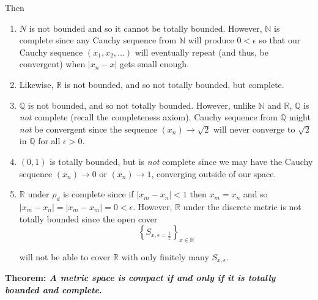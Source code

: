 \documentclass[12pt]{article}
\newcommand{\R}{\mathbb R}
\newcommand{\N}{\mathbb N}
\newcommand{\Q}{\mathbb Q}
\begin{document}
Then
\begin{enumerate}
	\item $N$ is not bounded and so it cannot be totally bounded. However, $\N$ is complete since any Cauchy sequence from $\N$ will produce $0 < \epsilon$ so that our Cauchy sequence $(x_1, x_2, ...)$ will eventually repeat (and thus, be convergent) when $|x_n - x|$ gets small enough. 
	\item Likewise, $\R$ is not bounded, and so not totally bounded, but complete.
	\item $\Q$ is not bounded, and so not totally bounded. However, unlike $\N$ and $\R$, $\Q$ is {\em not} complete (recall the completeness axiom). Cauchy sequence from $\Q$ might {\em not} be convergent since the sequence $(x_n) \to \sqrt{2}$ will never converge to $\sqrt{2}$ in $\Q$ for all $\epsilon > 0$.
	\item $(0, 1)$ is totally bounded, but is {\em not} complete since we may have the Cauchy sequence $(x_n) \to 0$ or $(x_n) \to 1$, converging outside of our space.
	\item $\R$ under $\rho_d$ is complete since if $|x_m - x_n| < 1$ then $x_m = x_n$ and so $|x_m - x_n| = |x_m - x_m| = 0 < \epsilon$. However, $\R$ under the discrete metric is not totally bounded since the open cover
	\begin{equation*}
		\left\{ S_{x,\epsilon = \frac{1}{2}} \right\}_{x\in\R}
	\end{equation*}
	
	will not be able to cover $\R$ with only finitely many $S_{x,\epsilon}$.
\end{enumerate}

%
%
{\bf Theorem: {\em A metric space is compact if and only if it is totally bounded and complete}.}
\end{document}
